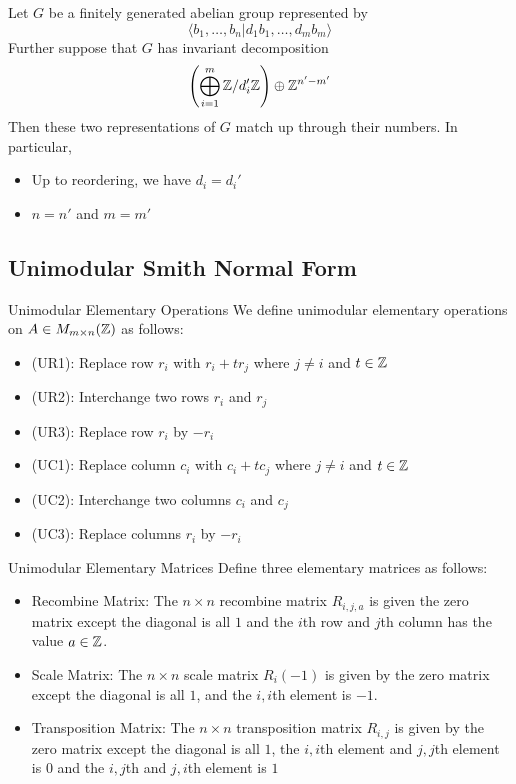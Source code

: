 \documentclass[a4paper]{article}
\begin{document}
\begin{thm}{}{} Let $G$ be a finitely generated abelian group represented by $$\langle b_1,\dots,b_n|d_1b_1,\dots,d_mb_m\rangle$$ Further suppose that $G$ has invariant decomposition $$\left(\bigoplus_{i=1}^m\mathbb{Z}/d_i'\mathbb{Z}\right)\oplus\mathbb{Z}^{n'-m'}$$ Then these two representations of $G$ match up through their numbers. In particular, 
\begin{itemize}
\item Up to reordering, we have $d_i=d_i'$
\item $n=n'$ and $m=m'$
\end{itemize}
\end{thm}

\subsection{Unimodular Smith Normal Form}
\begin{defn}{Unimodular Elementary Operations}{} We define unimodular elementary operations on $A\in M_{m\times n}(\mathbb{Z})$ as follows: 
\begin{itemize}
\item (UR1): Replace row $r_i$ with $r_i+tr_j$ where $j\neq i$ and $t\in\mathbb{Z}$
\item (UR2): Interchange two rows $r_i$ and $r_j$
\item (UR3): Replace row $r_i$ by $-r_i$
\item (UC1): Replace column $c_i$ with $c_i+tc_j$ where $j\neq i$ and $t\in\mathbb{Z}$
\item (UC2): Interchange two columns $c_i$ and $c_j$
\item (UC3): Replace columns $r_i$ by $-r_i$
\end{itemize}
\end{defn}

\begin{defn}{Unimodular Elementary Matrices}{} Define three elementary matrices as follows: 
\begin{itemize}
\item Recombine Matrix: The $n\times n$ recombine matrix $R_{i,j,a}$ is given the zero matrix except the diagonal is all $1$ and the $i$th row and $j$th column has the value $a\in\mathbb{Z}$. 
\item Scale Matrix: The $n\times n$ scale matrix $R_{i}(-1)$ is given by  the zero matrix except the diagonal is all $1$, and the $i,i$th element is $-1$. 
\item Transposition Matrix: The $n\times n$ transposition matrix $R_{i,j}$ is given by the zero matrix except the diagonal is all $1$, the $i,i$th element and $j,j$th element is $0$ and the $i,j$th and $j,i$th element is $1$
\end{itemize}
\end{defn}
\end{document}
